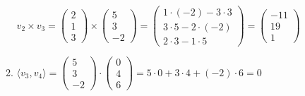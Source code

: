 \documentclass{standalone}
\begin{document}
\begin{enumerate}[a)]
\begin{enumerate}
        $ v_2 \times v_3 = 
        \begin{pmatrix}
            2 \\ 1 \\ 3
        \end{pmatrix}
        \times \begin{pmatrix}
            5 \\ 3 \\ -2
        \end{pmatrix}
        = \begin{pmatrix}
            1 \cdot (-2) - 3 \cdot 3 \\ 3 \cdot 5 - 2 \cdot (-2) \\ 2 \cdot 3 - 1 \cdot 5
        \end{pmatrix}
        = \begin{pmatrix}
            -11 \\ 19 \\ 1
        \end{pmatrix}$

        \item $\langle v_3,v_4 \rangle = 
        \begin{pmatrix}
            5 \\ 3 \\ -2
        \end{pmatrix}
        \cdot \begin{pmatrix}
            0 \\ 4 \\ 6
        \end{pmatrix}
        = 5 \cdot 0 + 3 \cdot 4 + (-2) \cdot 6 = 0$ \\
        

\end{enumerate}
\end{enumerate}
\end{document}
